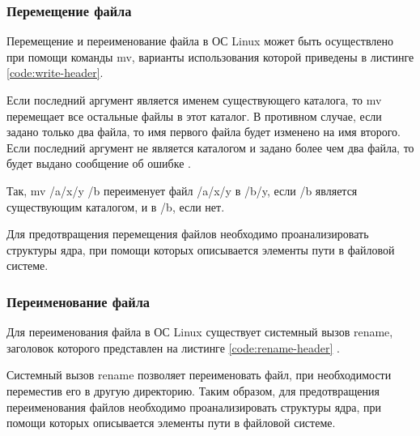 \subsubsection{Перемещение файла}

Перемещение и переименование файла в ОС Linux может быть осуществлено при помощи команды mv, варианты использования которой приведены в листинге \ref{code:write-header}.


Если последний аргумент является именем существующего каталога, то mv перемещает все остальные файлы в этот каталог. В противном случае, если задано только два файла, то имя первого файла будет изменено на имя второго. Если последний аргумент не является каталогом и задано более чем два файла, то будет выдано сообщение об ошибке \cite{mv-manual}.

Так, mv /a/x/y /b переименует файл /a/x/y в /b/y, если /b является существующим каталогом, и в /b, если нет.

Для предотвращения перемещения файлов	 необходимо проанализировать структуры ядра, при помощи которых описывается элементы пути в файловой системе.

\subsubsection{Переименование файла}

Для переименования файла в ОС Linux существует системный вызов rename, заголовок которого представлен на листинге \ref{code:rename-header} \cite{rename-manual}.


Системный вызов rename позволяет переименовать файл, при необходимости переместив его в другую директорию. Таким образом, для предотвращения переименования файлов необходимо проанализировать структуры ядра, при помощи которых описывается элементы пути в файловой системе.



